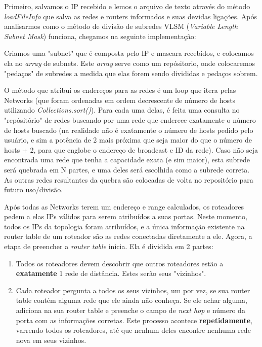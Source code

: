\documentclass[12pt]{article}
\begin{document}
Primeiro, salvamos o IP recebido e lemos o arquivo de texto através do método \textit{loadFileInfo} que salva as redes e routers informados e suas devidas ligações. Após analisarmos como o método de divisão de subredes VLSM (\textit{Variable Length Subnet Mask}) funciona, chegamos na seguinte implementação:

Criamos uma "subnet" que é composta pelo IP e mascara recebidos, e colocamos ela no \textit{array} de subnets.
Este \textit{array} serve como um repósitorio, onde colocaremos "pedaços" de subredes a medida que elas forem sendo divididas e pedaços sobrem.

O método que atribui os endereços para as redes é um loop que itera pelas Networks (que foram ordenadas em ordem decrescente de número de hosts utilizando \textit{Collections.sort()}). Para cada uma delas, é feita uma consulta no "repósitório" de redes buscando por uma rede que enderece exatamente o número de hosts buscado (na realidade não é exatamente o número de hosts pedido pelo usuário, e sim a potência de 2 mais próxima que seja maior do que o número de hosts + 2, para que englobe o endereço de broadcast e ID da rede). Caso não seja encontrada uma rede que tenha a capacidade exata (e sim maior), esta subrede será quebrada em N partes, e uma deles será escolhida como a subrede correta. As outras redes resultantes da quebra são colocadas de volta no repositório para futuro uso/divisão.

Após todas as Networks terem um endereço e range calculados, os roteadores pedem a elas IPs válidos para serem atribuídos a suas portas. Neste momento, todos os IPs da topologia foram atribuídos, e a única informação existente na router table de um roteador são as redes conectadas diretamente a ele. Agora, a etapa de preencher a \textit{router table} inicia. Ela é dividida em 2 partes:
\begin{enumerate}
\item Todos os roteadores devem descobrir que outros roteadores estão a \textbf{exatamente} 1 rede de distância. Estes serão seus "vizinhos".
\item Cada roteador pergunta a todos os seus vizinhos, um por vez, se sua router table contém alguma rede que ele ainda não conheça. Se ele achar alguma, adiciona na sua router table e preenche o campo de \textit{next hop} e número da porta com as informações corretas. Este processo acontece \textbf{repetidamente}, varrendo todos os roteadores, até que nenhum deles encontre nenhuma rede nova em seus vizinhos.
\end{enumerate}
\end{document}
